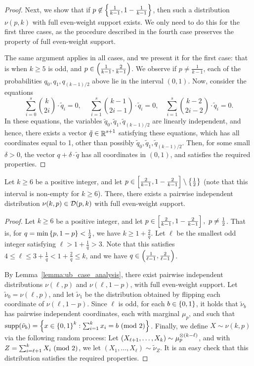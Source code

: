 \begin{proof}
	Next, we show that if $p\not\in \left\{ \frac{1}{k-1}, 1-\frac{1}{k-1} \right\}$, then such a distribution $\nu(p,k)$ with full even-weight support exists.
	We only need to do this for the first three cases, as the procedure described in the fourth case preserves the property of full even-weight support.
	 
	The same argument applies in all cases, and we present it for the first case: that is when $k\geq 5$ is odd, and $p \in \left( \frac{1}{k-1}, \frac{2}{k-1} \right)$.
	We observe if $p \not= \frac{1}{k-1}$, each of the probabilities $q_0,q_1,q_{(k-1)/2}$ above lie in the interval $(0,1)$.
	Now, consider the equations
	\[
		\sum_{i=0}^s \binom{k}{2i}\cdot  \tilde{q}_i = 0,\ \quad\sum_{i=1}^s \binom{k-1}{2i-1}\cdot \tilde{q}_i = 0,\quad \sum_{i=1}^s \binom{k-2}{2i-2}\cdot \tilde{q}_i = 0.
	\]
	In these equations, the variables $\tilde{q}_0, \tilde{q}_1, \tilde{q}_{(k-1)/2}$ are linearly independent, and hence, there exists a vector $\tilde{q} \in \mathop{\mathbb{R}}^{s+1}$ satisfying these equations, which has all coordinates equal to 1, other than possibly $\tilde{q}_0, \tilde{q}_1, \tilde{q}_{(k-1)/2}$.
	Then, for some small $\delta > 0$, the vector $q+\delta\cdot \tilde{q}$ has all coordinates in $(0,1)$, and satisfies the required properties.	
\end{proof}

\begin{lemma}\label{lemma:ub_add_ind_copies}
	Let $k\geq 6$ be a positive integer, and let $p \in \left[ \frac{2}{k-1},1-\frac{2}{k-1} \right] \setminus \left\{ \frac{1}{2} \right\}$ (note that this interval is non-empty for $k\geq 6$).
	There, there exists a pairwise independent distribution $\nu (k,p)\in \mathcal D(p,k)$ with full even-weight support.
\end{lemma}
\begin{proof}
	Let $k\geq 6$ be a positive integer, and let $p \in \left[ \frac{2}{k-1},1-\frac{2}{k-1} \right],\ p\not=\frac{1}{2}$.
	That is, for $q = \min\left\{ p,1-p \right\} < \frac{1}{2}$, we have $k \geq 1 + \frac{2}{q}$.
	Let $\ell$ be the smallest odd integer satisfying $\ell > 1+\frac{1}{q} > 3$.
	Note that this satisfies $4\leq \ell \leq 3+\frac{1}{q} < 1 + \frac{2}{q} \leq k$, and we have $q \in \left( \frac{1}{\ell-1}, \frac{2}{\ell-1} \right)$.	
	
	By Lemma~\ref{lemma:ub_case_analysis}, there exist pairwise independent distributions $\nu(\ell, p)$ and $\nu(\ell, 1-p)$, with full even-weight support.
	Let $\tilde{\nu}_0 = \nu(\ell, p)$, and let $\tilde{\nu}_1$ be the distribution obtained by flipping each coordinate of $\nu(\ell, 1-p)$.
	Since $\ell$ is odd, for each $b\in \left\{ 0,1 \right\}$, it holds that $\tilde{\nu}_b$ has pairwise independent coordinates, each with marginal $\mu_p$, and such that $\textnormal{supp}(\tilde{\nu}_b) = \left\{ x\in \left\{ 0,1 \right\}^k: \sum_{i=1}^k x_i = b \textnormal{ (mod 2)} \right\}$.
	Finally, we define $X \sim \nu(k,p)$ via the following random process: Let $(X_{\ell+1},\dots,X_k)\sim \mu_p^{\otimes\left( k-\ell \right)}$, and with $Z = \sum_{i=\ell+1}^k X_i \textnormal{ (mod 2)}$, we let $(X_1,\dots,X_\ell) \sim \tilde{\nu}_{Z}$.
	It is an easy check that this distribution satisfies the required properties.
\end{proof}


